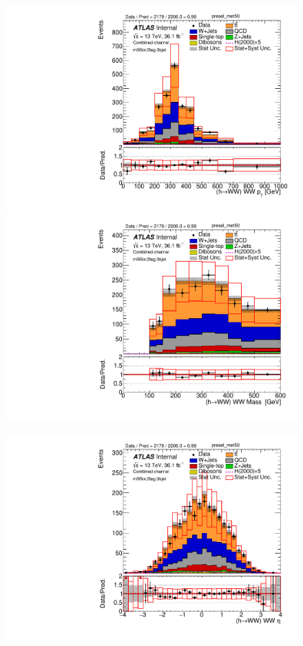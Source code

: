 \begin{figure}[!h]
\begin{center}
\includegraphics[scale=0.33]{./figures/boosted/PlotsInMbbCR/DataMC_2tag_0bjet_mbbcr_lepton_presel_met50_WWPt}
\includegraphics[scale=0.33]{./figures/boosted/PlotsInMbbCR/DataMC_2tag_0bjet_mbbcr_lepton_presel_met50_WWMass} \\
\par\medskip
\includegraphics[scale=0.33]{./figures/boosted/PlotsInMbbCR/DataMC_2tag_0bjet_mbbcr_lepton_presel_met50_WWEta}

\end{center}
\end{figure}
